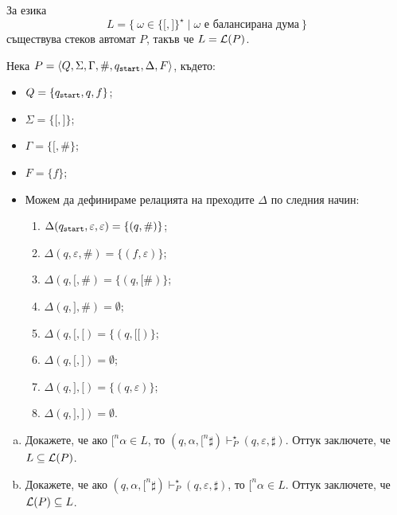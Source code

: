 \begin{example}
  За езика 
  \[L = \{\ \omega \in \{\texttt{[},\texttt{]}\}^\star \mid \omega\text{ е балансирана дума}\ \}\] съществува стеков автомат $P$, такъв че
  $L = \mathcal{L}(P)$.

  Нека $P = \langle{Q,\Sigma,\Gamma,\#,q_{\texttt{start}},\Delta,F}\rangle$, където:
  \begin{itemize}
  \item 
    $Q = \{q_{\texttt{start}},q,f\}$;
  \item
    $\Sigma = \{\texttt{[},\texttt{]}\}$;
  \item
    $\Gamma = \{\texttt{[}, \#\}$;
  \item
    $F = \{f\}$;
  \item
    Можем да дефинираме релацията на преходите $\Delta$ по следния начин:
    \begin{enumerate}[(1)]
    \item
      $\Delta(q_{\texttt{start}},\varepsilon,\varepsilon) = \{(q,\#)\}$;
    \item 
      $\Delta(q, \varepsilon, \#) = \{(f, \varepsilon)\}$;
    \item
      $\Delta(q, \texttt{[}, \#) = \{(q, \texttt{[}\#)\}$;
    \item
      $\Delta(q, \texttt{]}, \#) = \emptyset$;
    \item
      $\Delta(q, \texttt{[}, \texttt{[}) = \{(q, \texttt{[[})\}$;
    \item
      $\Delta(q, \texttt{[}, \texttt{]}) = \emptyset$;
    \item
      $\Delta(q, \texttt{]}, \texttt{[}) = \{(q, \varepsilon)\}$;
    \item
      $\Delta(q, \texttt{]}, \texttt{]}) = \emptyset$.
    \end{enumerate}
  \end{itemize}  

  \begin{enumerate}[(a)]
  \item
    Докажете, че ако $\texttt{[}^n\alpha \in L$, то $(q, \alpha, \texttt{[}^n\sharp) \vdash^\star_P (q, \varepsilon, \sharp)$.
    Оттук заключете, че $L \subseteq \mathcal{L}(P)$.
  \item
    Докажете, че ако $(q,\alpha,\texttt{[}^n\sharp) \vdash^\star_P (q, \varepsilon, \sharp)$, то
    $\texttt{[}^n\alpha \in L$.
    Оттук заключете, че $\mathcal{L}(P) \subseteq L$.
  \end{enumerate}
\end{example}


